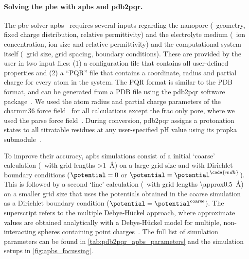 \paragraph{Solving the \gls{pbe} with \gls{apbs} and \gls{pdb2pqr}.}
%
The \gls{pbe} solver \gls{apbs}~\cite{Jurrus-2018,Baker-2001} requires several inputs regarding the nanopore
(\ie~geometry, fixed charge distribution, relative permittivity) and the electrolyte medium (\ie~ion
concentration, ion size and relative permittivity) and the computational system itself (\ie~grid size, grid
spacing, boundary conditions). These are provided by the user in two input files: (1) a configuration file
that contains all user-defined properties and (2) a ``PQR'' file that contains a coordinate, radius and
partial charge for every atom in the system. The PQR format is similar to the PDB format, and can be generated
from a PDB file using the \gls{pdb2pqr} software package~\cite{Jurrus-2018,Dolinsky-2004,Dolinsky-2007}. We
used the atom radius and partial charge parameters of the \gls{charmm36} force field~\cite{Huang-2013} for all
calculations except the \gls{frac} only pore, where we used the \gls{parse} force
field~\cite{Sitkoff-1994,Sitkoff-1996}. During conversion, \gls{pdb2pqr} assigns a protonation states to all
titratable residues at any user-specified pH value using its \gls{propka} submodule~\cite{Li-2005}.

To improve their accuracy, \gls{apbs} simulations consist of a initial `coarse' calculation (\ie~with grid
lengths \SI{>1}{\angstrom}) on a large grid size and with Dirichlet boundary conditions ($\potential = 0$ or
$\potential = \potential^{\code{mdh}}$). This is followed by a second `fine' calculation (\ie~with grid
lengths \SI{\approx0.5}{\angstrom}) on a smaller grid size that uses the potentials obtained in the coarse
simulation as a Dirichlet boundary condition ($\potential = \potential^{\mathrm{coarse}}$). The 
superscript refers to the multiple Debye-H\"{u}ckel approach, where approximate values are obtained
analytically with a Debye-H\"{u}ckel model for multiple, non-interacting spheres containing point
charges~\cite{Baker-2001,Baker-2005,Stone-2010}. The full list of simulation parameters can be found in
\cref{tab:pdb2pqr_apbs_parameters} and the simulation setups in \cref{fig:apbs_focussing}.

